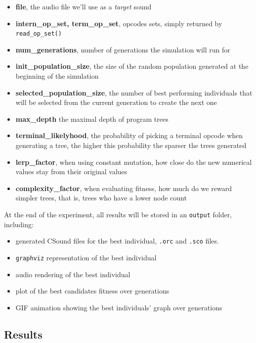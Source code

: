 \documentclass{article}
\newcommand{\code}[1]{\texttt{#1}}
\begin{document}
\begin{itemize}
    \item \textbf{file}, the audio file we'll use as a \textit{target} sound
    \item \textbf{intern\_op\_set, term\_op\_set}, opcodes sets, simply returned by \code{read\_op\_set()}
    \item \textbf{num\_generations}, number of generations the simulation will run for
    \item \textbf{init\_population\_size}, the size of the random population generated at the beginning of the simulation
    \item \textbf{selected\_population\_size}, the number of best performing individuals that will be selected from the current generation to create the next one
    \item \textbf{max\_depth} the maximal depth of program trees
    \item \textbf{terminal\_likelyhood}, the probability of picking a terminal opcode when generating a tree, the higher this probability the sparser the trees generated 
    \item \textbf{lerp\_factor}, when using constant mutation, how close do the new numerical values stay from their original values 
    \item \textbf{complexity\_factor}, when evaluating fitness, how much do we reward simpler trees, that is, trees who have a lower node count
    
\end{itemize}

At the end of the experiment, all results will be stored in an \code{output} folder, including:
\begin{itemize}
    \item generated CSound files for the best individual, \code{.orc} and \code{.sco} files.
    \item \code{graphviz} representation of the best individual
    \item audio rendering of the best individual
    \item plot of the best candidates fitness over generations
    \item GIF animation showing the best individuals' graph over generations
\end{itemize}

\subsection{Results}
\end{document}
